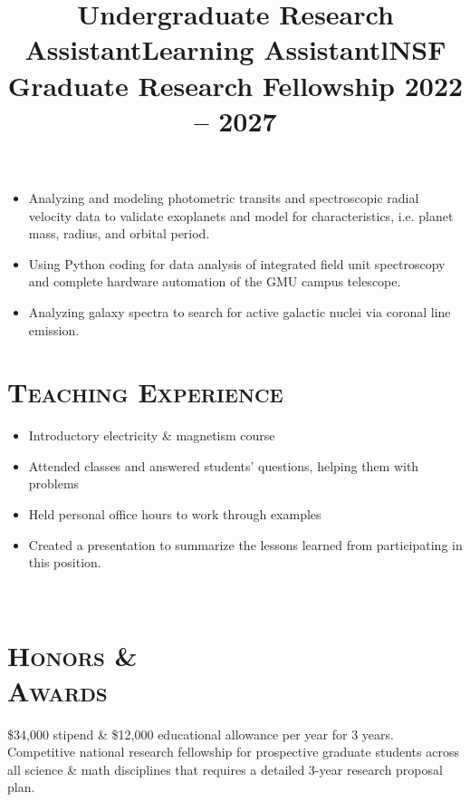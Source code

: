 \documentclass[marg, centered]{res}
\newcommand{\CVItem}[1]{
  \item\small{
    {#1 \vspace{-2pt}}
  }
}
\begin{document}
\begin{resume}
\title{\textbf{Undergraduate Research Assistant}}
\begin{position}
\vspace{-0.35cm}
\begin{itemize}
    \CVItem{Analyzing and modeling photometric transits and spectroscopic radial velocity data to validate exoplanets and model for characteristics, i.e. planet mass, radius, and orbital period.}
    \CVItem{Using Python coding for data analysis of integrated field unit spectroscopy and complete hardware automation of the GMU campus telescope.}
    \CVItem{Analyzing galaxy spectra to search for active galactic nuclei via coronal line emission.}
\end{itemize}
\end{position}

\section{{\scshape \bfseries Teaching Experience}}
\title{\textbf{Learning Assistant}}
\begin{position}
\vspace{-0.35cm}
\begin{itemize}
    \CVItem{Introductory electricity \& magnetism course}
    \CVItem{Attended classes and answered students’ questions, helping them with problems}
    \CVItem{Held personal office hours to work through examples}
    \CVItem{Created a presentation to summarize the lessons learned from participating in this position.}
\end{itemize}
\end{position}

\begin{format}
\title{l} \\
\body
\end{format}


\section{{\scshape \bfseries Honors \&\\ Awards}}

\title{\textbf{NSF Graduate Research Fellowship} \hfill \textbf{2022 -- 2027}}
\begin{position}
\$34,000 stipend \& \$12,000 educational allowance per year for 3 years. Competitive national research fellowship for prospective graduate students across all science \& math disciplines that requires a detailed 3-year research proposal plan.
\end{position}


\end{resume}
\end{document}
